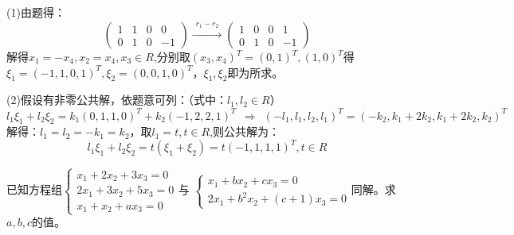 \documentclass[a4paper]{report}
\begin{document}
\begin{jie}
(1)由题得：
\begin{equation*}
\begin{pmatrix}
1&1&0&0\\
0&1&0&-1
\end{pmatrix}
\xrightarrow{\substack{r_1-r_2}}
{
\begin{pmatrix}
1&0&0&1\\
0&1&0&-1
\end{pmatrix}
}
\end{equation*}
解得$x_1=-x_4,x_2=x_4,x_3\in R$,分别取$(x_3,x_4)^T=(0,1)^T,(1,0)^T$得$\xi_1=(-1,1,0,1)^T,\xi_2=(0,0,1,0)^T$，$\xi_1,\xi_2$即为所求。

(2)假设有非零公共解，依题意可列：（式中：$l_1,l_2\in R$）
\begin{equation*}
l_1\xi_1+l_2\xi_2=k_1(0,1,1,0)^T + k_2(-1,2,2,1)^T~~\Rightarrow~~(-l_1,l_1,l_2,l_1)^T=(-k_2,k_1+2k_2,k_1+2k_2,k_2)^T
\end{equation*}
解得：$l_1=l_2=-k_1=k_2$，取$l_1=t,t\in R$,则公共解为：
\begin{equation*}
l_1\xi_1+l_2\xi_2=t(\xi_1+\xi_2)=t(-1,1,1,1)^T,t\in R
\end{equation*}
\end{jie}

\EX 已知方程组$
\begin{cases}
x_1+2x_2+3x_3=0\\
2x_1+3x_2+5x_3=0\\
x_1+x_2+ax_3=0
\end{cases}
$与
$
\begin{cases}
x_1+bx_2+cx_3=0\\
2x_1+b^2x_2+(c+1)x_3=0
\end{cases}
$同解。求$a,b,c$的值。
\end{document}
